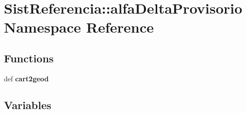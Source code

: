\section{\-Sist\-Referencia\-:\-:alfa\-Delta\-Provisorio \-Namespace \-Reference}
\label{namespace_sist_referencia_1_1alfa_delta_provisorio}
\subsection*{\-Functions}
\begin{DoxyCompactItemize}
\item 
def {\bf cart2geod}
\end{DoxyCompactItemize}
\subsection*{\-Variables}
